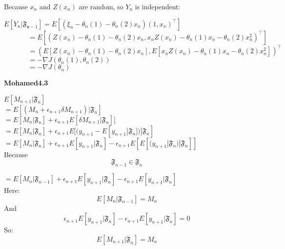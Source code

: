 \documentclass{article}
\begin{document}
Because $x_n$ and $Z(x_n)$ are random, so $Y_n$ is independent:
\begin{flushleft}
$ E[Y_n|\mathfrak{F_{n-1}}] = E[(\xi_n-\theta_n(1)-\theta_n(2)x_n)(1,x_n)^\intercal] $  \\
$ \ \ \ \ \ \ \ \ \ \ \ \ \ \ \ \ =E[(Z(x_n)-\theta_n(1)-\theta_n(2)x_n, x_nZ(x_n)-\theta_n(1)x_n-\theta_n(2)x_n^2)^\intercal] $  \\
$ \ \ \ \ \ \ \ \ \ \ \ \ \ \ \ \ =(E[Z(x_n)-\theta_n(1)-\theta_n(2)x_n], E[x_nZ(x_n)-\theta_n(1)x_n-\theta_n(2)x_n^2])^\intercal $  \\
$ \ \ \ \ \ \ \ \ \ \ \ \ \ \ \ \ =-\nabla J(\theta_n(1),\theta_n(2)) $  \\
$ \ \ \ \ \ \ \ \ \ \ \ \ \ \ \ \ =-\nabla J(\theta_n) $
\end{flushleft} 


\textbf {Mohamed4.3}  \\
\begin{flushleft}
$E[M_{n+1}|\mathfrak{F}_n] $ \\
$= E[(M_n+\epsilon_{n+1} \delta M_{n+1})|\mathfrak{F}_n]$  \\
$= E[M_n|\mathfrak{F}_n]+\epsilon_{n+1}E[\delta M_{n+1}|\mathfrak{F}_n]]$  \\
$= E[M_n|\mathfrak{F}_n]+\epsilon_{n+1}E[(y_{n+1}-E[y_{n+1}|\mathfrak{F}_n])|\mathfrak{F}_n] $  \\
$= E[M_n|\mathfrak{F}_n]+\epsilon_{n+1}E[y_{n+1}|\mathfrak{F}_n]-\epsilon_{n+1}E[E[(y_{n+1}|\mathfrak{F}_n)|\mathfrak{F}_n]] $ \\

Because $$\mathfrak{F}_{n-1} \in \mathfrak{F}_n$$

$=E[M_n|\mathfrak{F}_{n-1}]+\epsilon_{n+1}E[y_{n+1}|\mathfrak{F}_n]-\epsilon_{n+1}E[y_{n+1}|\mathfrak{F}_n]$ \\
Here: 
$$ E[M_n|\mathfrak{F}_{n-1}] = M_n $$
And
$$ \epsilon_{n+1}E[y_{n+1}|\mathfrak{F}_n]-\epsilon_{n+1}E[y_{n+1}|\mathfrak{F}_n] = 0 $$
So:
$$ E[M_{n+1}|\mathfrak{F}_n] = M_n $$

















\end{flushleft} 
\end{document}
